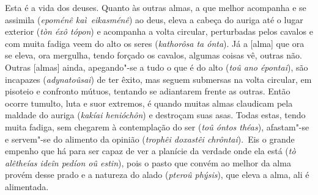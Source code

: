 \bekker{[248a]} Esta é a vida dos deuses. Quanto às outras almas, a que
melhor acompanha e se assimila (\emph{epoménê kaì}~\emph{eikasménê}) ao
deus, eleva a cabeça do auriga até o lugar exterior (\emph{tòn éxô
tópon}) e acompanha a volta circular, perturbadas pelos cavalos e com
muita fadiga veem do alto os seres (\emph{kathorôsa ta ónta}). Já a
[alma] que ora se eleva, ora mergulha, tendo forçado os cavalos,
algumas coisas vê, outras não. Outras [almas] ainda, apegando"-se a
tudo o que é do alto (\emph{toû ano épontai}), são incapazes
(\emph{adynatoûsai}) de ter êxito, mas seguem submersas na volta
circular, em pisoteio e confronto mútuos, tentando se adiantarem frente
as outras. \bekker{[248b]} Então ocorre tumulto, luta e suor extremos, é
quando muitas almas claudicam pela maldade do auriga (\emph{kakíai
henióchôn}) e destroçam suas asas. Todas estas, tendo muita fadiga, sem
chegarem à contemplação do ser (\emph{toû óntos théas}), afastam"-se e
servem"-se do alimento da opinião (\emph{trophêi doxastêi chrôntai}).~Eis
o grande empenho que há para ser capaz de ver a planície da verdade onde
ela está (\emph{tò alêtheías ideîn pedíon oû estin}), pois o pasto que
convém ao melhor da alma provém desse prado e a natureza do alado
(\emph{pteroû phýsis}), que eleva a alma, \bekker{[248c]} ali é alimentada.

